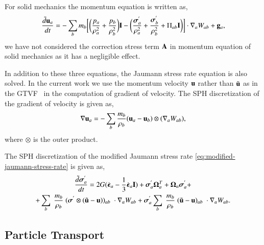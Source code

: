 %
For solid mechanics the momentum equation is written as,
\begin{equation}
  \label{eq:sph-momentum-solid}
  \frac{\tilde{d}\mathbf{u}_{a}}{dt} = - \sum_{b} m_b \bigg[
  \bigg(\frac{p_a}{\rho_a^2} + \frac{p_b}{\rho_b^2}\bigg) \mathbf{I} -
  \bigg(\frac{\boldsymbol{\sigma}^{'}_{a}}{\rho_a^2} +
  \frac{\boldsymbol{\sigma}^{'}_{b}}{\rho_b^2} + \Pi_{ab} \mathbf{I} \bigg) \bigg]  \cdot \nabla_{a} W_{ab} +
  \mathbf{g}_{a},
\end{equation}
we have not considered the correction stress term $\mathbf{A}$ in momentum
equation of solid mechanics as it has a negligible effect.

In addition to these three equations, the Jaumann stress rate equation is also
solved. In the current work we use the momentum velocity $\mathbf{u}$ rather than
$\tilde{\mathbf{u}}$ as in the GTVF~\citep{zhang_hu_adams17} in the computation of
gradient of velocity. The SPH discretization of the gradient of velocity is
given as,
\begin{equation}
  \label{eq:sph-vel-grad}
  \nabla \mathbf{u}_a =
  - \sum_{b} \frac{m_b}{\rho_{b}} (\mathbf{u}_{a} - \mathbf{u}_{b}) \otimes (\nabla_{a} W_{ab}),
\end{equation}
where $\otimes$ is the outer product.

The SPH discretization of the modified Jaumann stress rate
\cref{eq:modified-jaumann-stress-rate} is given as,
\begin{multline}
  \label{eq:sph-modified-jaumann-stress}
  \frac{\tilde{d}\boldsymbol{\sigma}^{'}_{a}}{dt} = 2G (\dot{\boldsymbol{\epsilon}}_{a} -
  \frac{1}{3} \dot{\boldsymbol{\epsilon}}_{a} \mathbf{I}) + \boldsymbol{\sigma}^{'}_{a}
  \boldsymbol{\Omega}_{a}^{T} +
  \boldsymbol{\Omega}_{a} \boldsymbol{\sigma}^{'}_{a} + \\
  + \sum_{b} \; \frac{m_b}{\rho_{b}} \; (\boldsymbol{\sigma}^{'} \otimes (\tilde{\mathbf{u}} -
  \mathbf{u}))_{ab} \; \cdot \nabla_{a} W_{ab}
  + \boldsymbol{\sigma}^{'}_{a} \sum_{b} \; \frac{m_b}{\rho_{b}} \;
  (\tilde{\mathbf{u}} - \mathbf{u})_{ab} \; \cdot \nabla_{a} W_{ab}.
\end{multline}



\subsection{Particle Transport}

